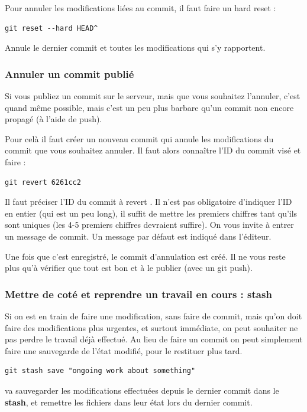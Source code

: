 \documentclass[a4paper,twoside]{article}
\begin{document}
\bigskip

Pour annuler les modifications liées au commit, il faut faire un hard reset :
\begin{verbatim}
git reset --hard HEAD^
\end{verbatim}
Annule le dernier commit et toutes les modifications qui s'y rapportent. 

\subsubsection{Annuler un commit publié}
Si vous publiez un commit sur le serveur, mais que vous souhaitez l'annuler, c'est quand même possible, mais c'est un peu plus barbare qu'un commit non encore propagé (à l'aide de push). 

Pour celà il faut créer un nouveau commit qui annule les modifications du commit que vous souhaitez annuler. Il faut alors connaître l'ID du commit visé et faire : 
\begin{verbatim}
git revert 6261cc2
\end{verbatim}
Il faut préciser l'ID du commit à \og revert \fg. Il n'est pas obligatoire d'indiquer l'ID en entier (qui est un peu long), il suffit de mettre les premiers chiffres tant qu'ils sont uniques (les 4-5 premiers chiffres devraient suffire). On vous invite à entrer un message de commit. Un message par défaut est indiqué dans l'éditeur.

Une fois que c'est enregistré, le commit d'annulation est créé. Il ne vous reste plus qu'à vérifier que tout est bon et à le publier (avec un git push).

\subsubsection{Mettre de coté et reprendre un travail en cours : stash}\label{sec:stash}
Si on est en train de faire une modification, sans faire de commit, mais qu'on doit faire des modifications plus urgentes, et surtout immédiate, on peut souhaiter ne pas perdre le travail déjà effectué. Au lieu de faire un commit on peut simplement faire une sauvegarde de l'état modifié, pour le restituer plus tard.

\begin{verbatim}
git stash save "ongoing work about something"
\end{verbatim}
va sauvegarder les modifications effectuées depuis le dernier commit dans le \textbf{stash}, et remettre les fichiers dans leur état lors du dernier commit. 
\end{document}
